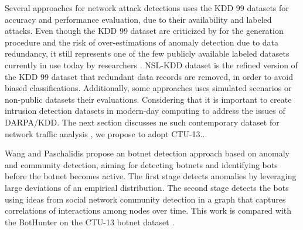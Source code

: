 \documentclass[review]{elsarticle}
\begin{document}
Several approaches for network attack detections uses the KDD 99 \cite{ji2016multi,ahmed2016survey,osanaiye2016distributed,bhuyan2014network} datasets for accuracy and performance evaluation, due to their availability and labeled attacks. Even though the KDD 99 dataset are criticized by for the generation procedure and the risk of over-estimations of anomaly detection due to data redundancy, it still represents one of the few publicly available labeled datasets currently in use today by researchers \cite{osanaiye2016distributed,bhuyan2014network}. NSL-KDD \cite{tavallaee2009detailed} dataset is the refined version of the KDD 99 dataset that redundant data records are removed, in order to avoid biased classifications. Additionally, some approaches uses simulated \cite{callegari2011novel} scenarios or non-public datasets their evaluations. Considering that it is important to create intrusion detection datasets in modern-day computing to address the issues of DARPA/KDD. The next section discusses ne such contemporary dataset for network traffic analysis \cite{ahmed2016survey}, we propose to adopt CTU-13...

Wang and Paschalidis \cite{wang2017botnet} propose an botnet detection approach based on anomaly and community detection, aiming for detecting botnets and identifying bots before the botnet becomes active. The first stage detects anomalies by leveraging large deviations of an empirical distribution. The second stage detects the bots using ideas from social network community detection in a graph that captures correlations of interactions among nodes over time. This work is compared with the BotHunter \cite{gu2007bothunter} on the CTU-13 botnet dataset \cite{garcia2014empirical}.

\end{document}
